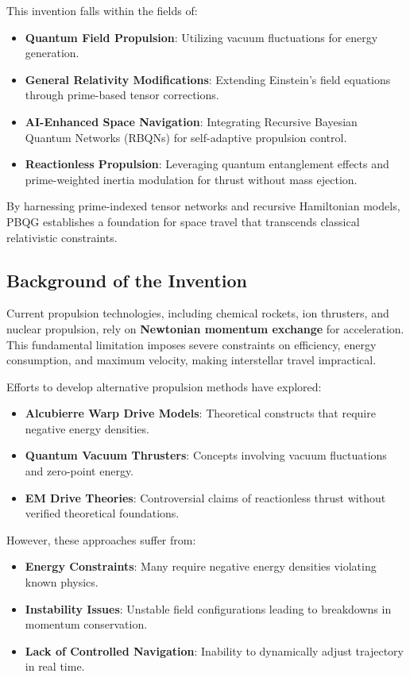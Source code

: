\documentclass{article}
\theoremstyle{plain}
\begin{document}
This invention falls within the fields of:
\begin{itemize}
    \item \textbf{Quantum Field Propulsion}: Utilizing vacuum fluctuations for energy generation.
    \item \textbf{General Relativity Modifications}: Extending Einstein’s field equations through prime-based tensor corrections.
    \item \textbf{AI-Enhanced Space Navigation}: Integrating Recursive Bayesian Quantum Networks (RBQNs) for self-adaptive propulsion control.
    \item \textbf{Reactionless Propulsion}: Leveraging quantum entanglement effects and prime-weighted inertia modulation for thrust without mass ejection.
\end{itemize}

By harnessing prime-indexed tensor networks and recursive Hamiltonian models, PBQG establishes a foundation for space travel that transcends classical relativistic constraints.

\subsection{Background of the Invention}
\label{subsec:background}

Current propulsion technologies, including chemical rockets, ion thrusters, and nuclear propulsion, rely on \textbf{Newtonian momentum exchange} for acceleration. This fundamental limitation imposes severe constraints on efficiency, energy consumption, and maximum velocity, making interstellar travel impractical.

Efforts to develop alternative propulsion methods have explored:
\begin{itemize}
    \item \textbf{Alcubierre Warp Drive Models}: Theoretical constructs that require negative energy densities.
    \item \textbf{Quantum Vacuum Thrusters}: Concepts involving vacuum fluctuations and zero-point energy.
    \item \textbf{EM Drive Theories}: Controversial claims of reactionless thrust without verified theoretical foundations.
\end{itemize}

However, these approaches suffer from:
\begin{itemize}
    \item \textbf{Energy Constraints}: Many require negative energy densities violating known physics.
    \item \textbf{Instability Issues}: Unstable field configurations leading to breakdowns in momentum conservation.
    \item \textbf{Lack of Controlled Navigation}: Inability to dynamically adjust trajectory in real time.
\end{itemize}
\end{document}
